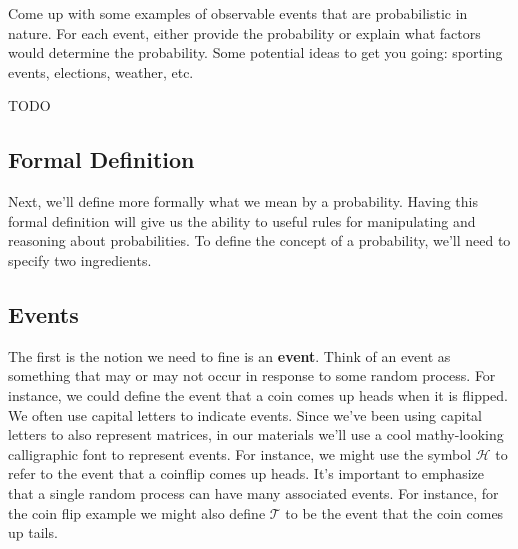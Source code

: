 \documentclass[assignment01_Solutions]{subfiles}
\begin{document}
\vspace{1em}
\begin{exercise}[(10 minutes)]
Come up with some examples of observable events that are probabilistic in nature.  For each event, either provide the probability or explain what factors would determine the probability.  Some potential ideas to get you going: sporting events, elections, weather, etc.

\begin{boxedsolution}
TODO
\end{boxedsolution}

\end{exercise}

\subsection{Formal Definition}

Next, we'll define more formally what we mean by a probability.  Having this formal definition will give us the ability to useful rules for manipulating and reasoning about probabilities.  To define the concept of a probability, we'll need to specify two ingredients.
\subsection{Events}

The first is the notion we need to fine is an \textbf{event}.  Think of an event as something that may or may not occur in response to some random process.  For instance, we could define the event that a coin comes up heads when it is flipped.  We often use capital letters to indicate events.  Since we've been using capital letters to also represent matrices, in our materials we'll use a cool mathy-looking calligraphic font to represent events.  For instance, we might use the symbol $\mathcal{H}$ to refer to the event that a coinflip comes up heads. It's important to emphasize that a single random process can have many associated events.   For instance, for the coin flip example we might also define $\mathcal{T}$ to be the event that the coin comes up tails.
\end{document}
